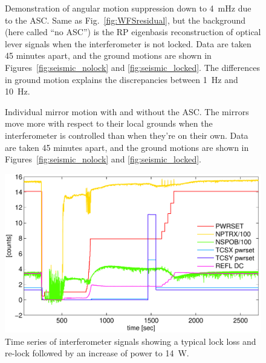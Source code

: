 \begin{figure}
\begin{centering}
\caption[Angular motion suppression due to the ASC]{Demonstration of
  angular motion suppression down to 4~mHz due to the ASC. Same as
  Fig.~\ref{fig:WFSresidual}, but the background (here called ``no
  ASC'') is the RP eigenbasis reconstruction of optical lever signals
  when the interferometer is not locked. Data are taken 45 minutes
  apart, and the ground motions are shown in
  Figures~\ref{fig:seismic_nolock} and \ref{fig:seismic_locked}. The
  differences in ground motion explains the discrepancies between 1~Hz
  and 10~Hz.}
\label{fig:ASConoff}
\end{centering}
\end{figure}




\begin{figure}
\begin{centering}
\caption[Individual mirror motion with and without ASC]{Individual
  mirror motion with and without the ASC. The mirrors move more with
  respect to their local grounds when the interferometer is controlled
  than when they're on their own. Data are taken 45 minutes apart, and the ground
  motions are shown in Figures~\ref{fig:seismic_nolock} and
  \ref{fig:seismic_locked}.}
\label{fig:mirror_onoff}
\end{centering}
\end{figure}



\begin{figure}
\begin{centering}
\includegraphics[width=1.0\columnwidth]{figures/timeseries_ifolocked.pdf}
\caption[Striptool example]{Time series of interferometer signals
  showing a typical lock loss and re-lock followed by an increase of
  power to 14~W.} 
\label{fig:striptool}
\end{centering}
\end{figure}




